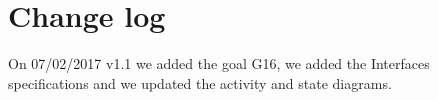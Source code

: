 \documentclass{scrreprt}
\begin{document}
\section{Change log}
On 07/02/2017 v1.1 we added the goal G16, we added the Interfaces specifications and we updated the activity and state diagrams.

\begin{comment}
\section{Appendix C: To Be Determined List}
\begin{comment}$<$Collect a numbered list of the TBD (to be determined) references that remain 
in the SRS so they can be tracked to closure.$>$
\end{comment}
\end{document}
